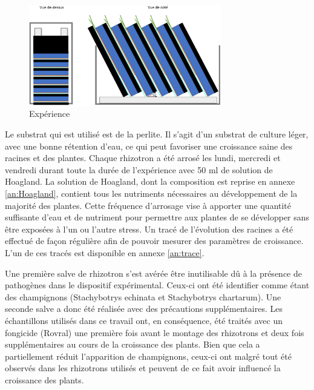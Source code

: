 \begin{figure}[ht]
\centering
\includegraphics[width=0.75\textwidth]{Image/montage.png}
\caption{Expérience}
\label{fig:montage}
\end{figure}

Le substrat qui est utilisé est de la perlite.
Il s'agit d'un substrat de culture léger, avec une bonne rétention d'eau, ce qui peut favoriser une croissance saine des racines et des plantes.
Chaque rhizotron a été arrosé les lundi, mercredi et vendredi durant toute la durée de l'expérience avec 50 ml de solution de Hoagland.
La solution de Hoagland, dont la composition est reprise en annexe \ref{an:Hoagland}, contient tous les nutriments nécessaires au développement de la majorité des plantes.
Cette fréquence d'arrosage vise à apporter une quantité suffisante d'eau et de nutriment pour permettre aux plantes de se développer sans être exposées à l'un ou l'autre stress.
Un tracé de l'évolution des racines a été effectué de façon régulière afin de pouvoir mesurer des paramètres de croissance.
L'un de ces tracés est disponible en annexe \ref{an:trace}.
\newline

Une première salve de rhizotron s'est avérée être inutilisable dû à la présence de pathogènes dans le dispositif expérimental.
Ceux-ci ont été identifier comme étant des champignons (Stachybotrys echinata et Stachybotrys chartarum).
Une seconde salve a donc été réalisée avec des précautions supplémentaires.
Les échantillons utilisés dans ce travail ont, en conséquence, été traités avec un fongicide (Rovral) une première fois avant le montage des rhizotrons et deux fois supplémentaires au cours de la croissance des plants.
Bien que cela a partiellement réduit l'apparition de champignons, ceux-ci ont malgré tout été observés dans les rhizotrons utilisés et peuvent de ce fait avoir influencé la croissance des plants.

